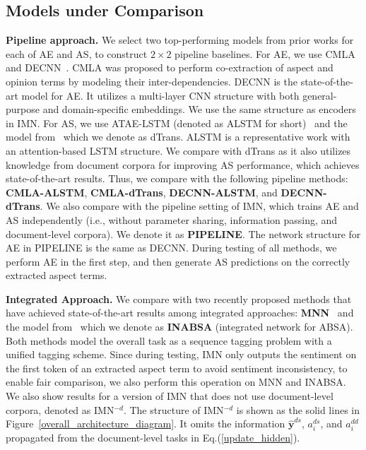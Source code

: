 \documentclass[11pt,a4paper]{article}
\begin{document}
\subsection{Models under Comparison}
\textbf{Pipeline approach. } 
We select two top-performing models from prior works for each of AE and AS, to construct $2 \times 2$ pipeline baselines.
For AE, we use CMLA~\citep{Wang:17} and DECNN~\citep{hu:18}. CMLA was proposed to perform co-extraction of aspect and opinion terms by modeling their inter-dependencies. DECNN is the state-of-the-art model for AE. It utilizes a multi-layer CNN structure with both general-purpose and domain-specific embeddings. We use the same structure as encoders in IMN.
For AS, we use ATAE-LSTM (denoted as ALSTM for short)~\citep{Wang:16} and the model from~\citep{He:18} which we denote as dTrans. ALSTM is a representative work with an attention-based LSTM structure. We compare with dTrans as it also utilizes knowledge from document corpora for improving AS performance, which achieves state-of-the-art results.  Thus, we compare with the following pipeline methods: \textbf{CMLA-ALSTM}, \textbf{CMLA-dTrans}, \textbf{DECNN-ALSTM}, and \textbf{DECNN-dTrans}. We also compare with the pipeline setting of IMN, which trains AE and AS independently (i.e., without parameter sharing, information passing, and document-level corpora). We denote it as \textbf{PIPELINE}. The network structure for AE in PIPELINE is the same as DECNN. During testing of all methods, we perform AE in the first step, and then generate AS predictions on the correctly extracted aspect terms. 
\smallskip

\noindent\textbf{Integrated Approach. } We compare with two recently proposed methods that have achieved state-of-the-art results among integrated approaches: \textbf{MNN}~\citep{Wang:18b} and the model from~\citep{Li:19} which we denote as \textbf{INABSA} (integrated network for ABSA). Both methods model the overall task as a sequence tagging problem with a unified tagging scheme. Since during testing, IMN only outputs the sentiment on the first token of an extracted aspect term to avoid sentiment inconsistency, to enable fair comparison, we also perform this operation on MNN and INABSA. We also show results for a version of IMN that does not use document-level corpora, denoted as IMN$^{-d}$. The structure of IMN$^{-d}$ is shown as the solid lines in Figure~\ref{overall_architecture_diagram}. It omits the information $\hat{\mathbf{y}}^{ds}$, $a_i^{ds}$, and $a_i^{dd}$ propagated from the document-level tasks in Eq.(\ref{update_hidden}).
\medskip
\end{document}
